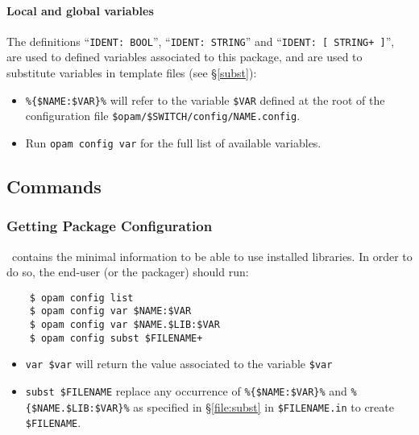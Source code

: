 \documentclass[a4paper,10pt]{article}
\begin{document}
\paragraph{Local and global variables}

The definitions ``{\tt IDENT: BOOL}'', ``{\tt IDENT: STRING}'' and ``{\tt IDENT:
  [ STRING+ ]}'', are used to defined variables associated to this
package, and are used to substitute variables in template files (see
\S\ref{subst}):

\begin{itemize}

\item \verb+%{$NAME:$VAR}%+ will refer to the variable \verb+$VAR+
  defined at the root of the configuration file \verb+$opam/$SWITCH/config/NAME.config+.

\item Run {\tt opam config var} for the full list of available
  variables.

\end{itemize}

\subsection{Commands}

\subsubsection{Getting Package Configuration}
\label{opam-config}

\OPAM\ contains the minimal information to be able to use installed
libraries. In order to do so, the end-user (or the packager) should
run:

\begin{verbatim}
    $ opam config list
    $ opam config var $NAME:$VAR
    $ opam config var $NAME.$LIB:$VAR
    $ opam config subst $FILENAME+
\end{verbatim}

\begin{itemize}
\item \verb+var $var+ will return the value associated to the
  variable \verb+$var+
\item \label{subst}\verb+subst $FILENAME+ replace any occurrence of
  \verb+%{$NAME:$VAR}%+ and \verb+%{$NAME.$LIB:$VAR}%+ as specified in
  \S\ref{file:subst} in \verb+$FILENAME.in+ to create \verb+$FILENAME+.
\end{itemize}
\end{document}
